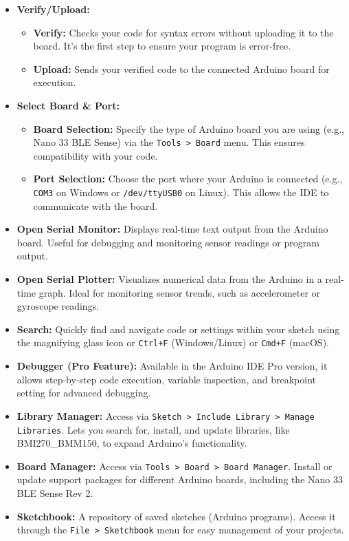 	\begin{itemize}
		\item \textbf{Verify/Upload:}
		\begin{itemize}
			\item \textbf{Verify:} Checks your code for syntax errors without uploading it to the board. It's the first step to ensure your program is error-free.
			\item \textbf{Upload:} Sends your verified code to the connected Arduino board for execution.
		\end{itemize}
		
		\item \textbf{Select Board \& Port:}
		\begin{itemize}
			\item \textbf{Board Selection:} Specify the type of Arduino board you are using (e.g., Nano 33 BLE Sense) via the \texttt{Tools > Board} menu. This ensures compatibility with your code.
			\item \textbf{Port Selection:} Choose the port where your Arduino is connected (e.g., \texttt{COM3} on Windows or \texttt{/dev/ttyUSB0} on Linux). This allows the IDE to communicate with the board.
		\end{itemize}
		
		\item \textbf{Open Serial Monitor:} Displays real-time text output from the Arduino board. Useful for debugging and monitoring sensor readings or program output.
		
		\item \textbf{Open Serial Plotter:} Visualizes numerical data from the Arduino in a real-time graph. Ideal for monitoring sensor trends, such as accelerometer or gyroscope readings.
		
		\item \textbf{Search:} Quickly find and navigate code or settings within your sketch using the magnifying glass icon or \texttt{Ctrl+F} (Windows/Linux) or \texttt{Cmd+F} (macOS).
		
		\item \textbf{Debugger (Pro Feature):} Available in the Arduino IDE Pro version, it allows step-by-step code execution, variable inspection, and breakpoint setting for advanced debugging.
		
		\item \textbf{Library Manager:} Access via \texttt{Sketch > Include Library > Manage Libraries}. Lets you search for, install, and update libraries, like BMI270\_BMM150, to expand Arduino's functionality.
		
		\item \textbf{Board Manager:} Access via \texttt{Tools > Board > Board Manager}. Install or update support packages for different Arduino boards, including the Nano 33 BLE Sense Rev 2.
		
		\item \textbf{Sketchbook:} A repository of saved sketches (Arduino programs). Access it through the \texttt{File > Sketchbook} menu for easy management of your projects\cite{ArduinoIDE:2024}.
	\end{itemize}
	
